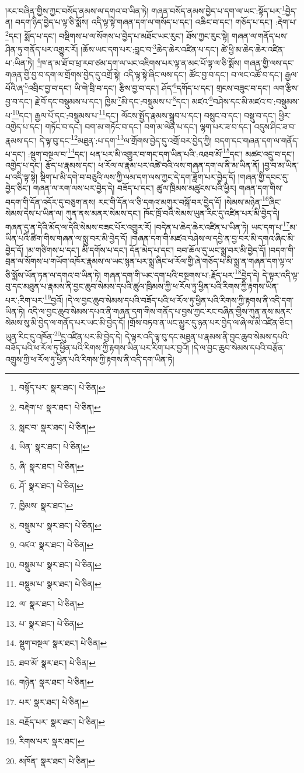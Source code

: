 །རང་བཞིན་གྱིས་ཀྱང་བསོད་ནམས་ལ་དགའ་བ་ཡིན་ཏེ། གཞན་བསོད་ནམས་བྱེད་པ་དག་ལ་ཡང་:སྟོད་པར་\footnote{བསྟོད་པར་  སྣར་ཐང་།  པེ་ཅིན། }བྱེད་ན། བདག་ཉིད་བྱེད་པ་ལྟ་ཅི་སྨོས། འདི་ལྟ་སྟེ་གཞན་དག་ལ་གསོད་པ་དང་། འཆིང་བ་དང་། གཅོད་པ་དང་། :རྡེག་པ་\footnote{བརྡེག་པ་  སྣར་ཐང་།  པེ་ཅིན། }དང་། སྨོད་པ་དང་། བསྡིགས་པ་ལ་སོགས་པ་བྱེད་པ་མཐོང་ཡང་རུང་། ཐོས་ཀྱང་རུང་སྟེ། གཞན་ལ་གནོད་པས་ཤིན་ཏུ་གནོད་པར་འགྱུར་རོ། །ཆོས་ཡང་དག་པར་:བླང་བ་\footnote{སླང་བ་  སྣར་ཐང་།  པེ་ཅིན། }ཆེད་ཆེར་འཛིན་པ་དང་། ཚེ་ཕྱི་མ་ཆེད་ཆེར་འཛིན་པ་:ཡིན་ཏེ། \footnote{ཡིན་  སྣར་ཐང་།  པེ་ཅིན། }ཁ་ན་མ་ཐོ་བ་ཕྲ་རབ་ཙམ་དག་ལ་ཡང་འཇིགས་པར་ལྟ་ན་མང་པོ་ལྟ་ལ་ཅི་སྨོས། གཞན་གྱི་ལས་དང་གཞན་གྱི་བྱ་བ་དག་ལ་གྲོགས་བྱེད་དུ་འགྲོ་སྟེ། འདི་ལྟ་སྟེ་ཞིང་ལས་དང་། ཚོང་བྱ་བ་དང་། བ་ལང་འཚོ་བ་དང་། རྒྱལ་པོའི་ཞ་\footnote{ཞི་  སྣར་ཐང་།  པེ་ཅིན། }འབྲིང་བྱ་བ་དང་། ཡི་གེ་བྲི་བ་དང་། རྩིས་བྱ་བ་དང་། ཤོད་\footnote{ཤོ་  སྣར་ཐང་།  པེ་ཅིན། }དགོད་པ་དང་། གྲངས་བཟུང་བ་དང་། ལག་རྩིས་བྱ་བ་དང་། རྗེ་བོ་དང་བསྡུམས་པ་དང་། ཁྱིམ་\footnote{ཁྱིམས་  སྣར་ཐང་། }མི་དང་:བསྡུམས་པ་\footnote{བསྡུམ་པ་  སྣར་ཐང་།  པེ་ཅིན། }དང་། མཛའ་\footnote{འཛའ་  སྣར་ཐང་།  པེ་ཅིན། }བཤེས་དང་མི་མཛའ་བ་:བསྡུམས་པ་\footnote{བསྡུམ་པ་  སྣར་ཐང་།  པེ་ཅིན། }དང་། རྒྱལ་པོ་དང་:བསྡུམས་པ་\footnote{བསྡུམ་པ་  སྣར་ཐང་།  པེ་ཅིན། }དང་། ལོངས་སྤྱོད་རྣམས་སྒྲུབ་པ་དང་། བསྲུང་བ་དང་། བསྡུ་བ་དང་། ཕྱིར་འགྱེད་པ་དང་། གཏོང་བ་དང་། བག་མ་གཏོང་བ་དང་། བག་མ་ལེན་པ་དང་། ལྷག་པར་ཟ་བ་དང་། འདུས་ཤིང་ཟ་བ་རྣམས་དང་། དེ་ལྟ་བུ་དང་\footnote{ལ་  སྣར་ཐང་།  པེ་ཅིན། }མཐུན་:པ་དག་\footnote{པ་  སྣར་ཐང་།  པེ་ཅིན། }ལ་གྲོགས་བྱེད་དུ་འགྲོ་བར་བྱེད་ཀྱི། བདག་དང་གཞན་དག་ལ་གནོད་པ་དང་། :སྡུག་བསྔལ་བ་\footnote{སྡུག་བསྔལ་  སྣར་ཐང་།  པེ་ཅིན། }དང་། ཕན་པར་མི་འགྱུར་བ་གང་དག་ཡིན་པའི་:འཐབ་མོ་\footnote{ཐབ་མོ་  སྣར་ཐང་།  པེ་ཅིན། }དང་། མཚང་འདྲུ་བ་དང་། འགྱེད་པ་དང་། རྩོད་པ་རྣམས་དང་། ཕ་རོལ་ལ་རྣམ་པར་འཚེ་བའི་ལས་གཞན་དག་ལ་ནི་མ་ཡིན་ནོ། །བྱ་བ་མ་ཡིན་པ་འདི་ལྟ་སྟེ། སྡིག་པ་མི་དགེ་བ་བཅུའི་ལས་ཀྱི་ལམ་དག་ལས་ཀྱང་དེ་དག་ཟློག་པར་བྱེད་དོ། །གཞན་གྱི་དབང་དུ་བྱེད་ཅིང་། གཞན་ལ་རག་ལས་པར་བྱེད་དེ། བཟོད་པ་དང་། ཚུལ་ཁྲིམས་མཚུངས་པའི་ཕྱིར། གཞན་དག་གིས་བདག་གི་དོན་འདོར་དུ་བཅུག་ནས། རང་གི་དོན་ལ་ཅི་དགའ་མགུར་བསྐོ་བར་བྱེད་དོ། །སེམས་མཉེན་\footnote{གཉེན་  སྣར་ཐང་།  པེ་ཅིན། }ཞིང་སེམས་དེས་པ་ཡིན་ལ། ཀུན་ནས་མནར་སེམས་དང་། ཁོང་ཁྲོ་བའི་སེམས་ཡུན་རིང་དུ་འཛིན་པར་མི་བྱེད་དེ། གཞན་དུ་ན་དེའི་མོད་ལ་དེའི་སེམས་བཟང་པོར་འགྱུར་རོ། །བདེན་པ་ཆེད་ཆེར་འཛིན་པ་ཡིན་ཏེ། ཡང་དག་པ་\footnote{པར་  སྣར་ཐང་།  པེ་ཅིན། }མ་ཡིན་པའི་ཚིག་གིས་གཞན་ལ་སླུ་བར་མི་བྱེད་དོ། །གཞན་དག་གི་མཛའ་བཤེས་ལ་དབྱེ་ན་བྱ་བར་མི་དགའ་ཞིང་མི་བྱེད་དོ། །མ་གཙིགས་པ་དང་། མི་དགོས་པ་དང་། དོན་མེད་པ་དང་། བབ་ཆོལ་དུ་ཡང་སྨྲ་བར་མི་བྱེད་དོ། །བདག་གི་བྲན་ལ་སོགས་པ་གཡོག་འཁོར་རྣམས་ལ་ཡང་སྙན་པར་སྨྲ་ཞིང་ཕ་རོལ་གྱི་ཞེ་གཅོད་པ་མི་སྨྲ་ན་གཞན་དག་ལྟ་ལ་ཅི་སྨོས་ཡོན་ཏན་ལ་དགའ་བ་ཡིན་ཏེ། གཞན་དག་གི་ཡང་དག་པའི་བསྔགས་པ་:རྗོད་པར་\footnote{བརྗོད་པར་  སྣར་ཐང་།  པེ་ཅིན། }བྱེད་དེ། དེ་ལྟར་འདི་ལྟ་བུ་དང་མཐུན་པ་རྣམས་ནི་བྱང་ཆུབ་སེམས་དཔའི་ཚུལ་ཁྲིམས་ཀྱི་ཕ་རོལ་ཏུ་ཕྱིན་པའི་རིགས་ཀྱི་རྟགས་ཡིན་པར་:རིག་པར་\footnote{རིགས་པར་  སྣར་ཐང་། }བྱའོ། །དེ་ལ་བྱང་ཆུབ་སེམས་དཔའི་བཟོད་པའི་ཕ་རོལ་ཏུ་ཕྱིན་པའི་རིགས་ཀྱི་རྟགས་ནི་འདི་དག་ཡིན་ཏེ། འདི་ལ་བྱང་ཆུབ་སེམས་དཔའ་ནི་གཞན་དག་གིས་གནོད་པ་བྱས་ཀྱང་རང་བཞིན་གྱིས་ཀུན་ནས་མནར་སེམས་སུ་མི་བྱེད་ལ་གནོད་པར་ཡང་མི་བྱེད་དོ། །གྲོས་བཏབ་ན་ཡང་མྱུར་དུ་ཉན་པར་བྱེད་ལ་ཞེ་ལ་མི་འཛིན་ཅིང་། ཡུན་རིང་དུ་འཁོན་\footnote{མཁོན་  སྣར་ཐང་།  པེ་ཅིན། }དུ་འཛིན་པར་མི་བྱེད་དེ། དེ་ལྟར་འདི་ལྟ་བུ་དང་མཐུན་པ་རྣམས་ནི་བྱང་ཆུབ་སེམས་དཔའི་བཟོད་པའི་ཕ་རོལ་ཏུ་ཕྱིན་པའི་རིགས་ཀྱི་རྟགས་ཡིན་པར་རིག་པར་བྱའོ། །དེ་ལ་བྱང་ཆུབ་སེམས་དཔའི་བརྩོན་འགྲུས་ཀྱི་ཕ་རོལ་ཏུ་ཕྱིན་པའི་རིགས་ཀྱི་རྟགས་ནི་འདི་དག་ཡིན་ཏེ། 